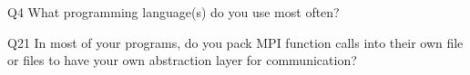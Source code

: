 \begin{description}%
\item{Q4} What programming language(s) do you use most often?%
\item{Q21} In most of your programs, do you pack MPI function calls into their own file or files to have your own abstraction layer for communication?%
\end{description}%
